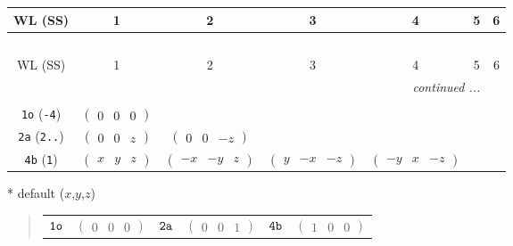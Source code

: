 \documentclass[fleqn,9pt,landscape]{jsarticle}
\begin{document}
\begin{center}
\renewcommand{\arraystretch}{1.2}
\begin{longtable}{ccccccc}
 \hline \hline
WL (SS) & 1 & 2 & 3 & 4 & 5 & 6 \\ \hline \endfirsthead

\multicolumn{6}{l}{\tablename\ \thetable{}} \\
 \hline \hline
WL (SS) & 1 & 2 & 3 & 4 & 5 & 6 \\ \hline \endhead

 \hline \hline
\multicolumn{6}{r}{\footnotesize\it continued ...} \\ \endfoot

 \hline \hline
\multicolumn{6}{r}{} \\ \endlastfoot

{\tt 1o} ({\tt -4}) & $ \begin{pmatrix} 0 & 0 & 0 \end{pmatrix} $ & $  $ & $  $ & $  $ \\ \hline
{\tt 2a} ({\tt 2..}) & $ \begin{pmatrix} 0 & 0 & z \end{pmatrix} $ & $ \begin{pmatrix} 0 & 0 & - z \end{pmatrix} $ & $  $ & $  $ \\ \hline
{\tt 4b} ({\tt 1}) & $ \begin{pmatrix} x & y & z \end{pmatrix} $ & $ \begin{pmatrix} - x & - y & z \end{pmatrix} $ & $ \begin{pmatrix} y & - x & - z \end{pmatrix} $ & $ \begin{pmatrix} - y & x & - z \end{pmatrix} $ \\
\end{longtable}
\end{center}
* default ($x$,$y$,$z$)
\begin{quote}
\begin{tabular}{cccccc}
$ {\tt 1o} $ & $ \begin{pmatrix} 0 & 0 & 0 \end{pmatrix} $ & $ {\tt 2a} $ & $ \begin{pmatrix} 0 & 0 & 1 \end{pmatrix} $ & $ {\tt 4b} $ & $ \begin{pmatrix} 1 & 0 & 0 \end{pmatrix} $
\end{tabular}
\end{quote}
\end{document}
